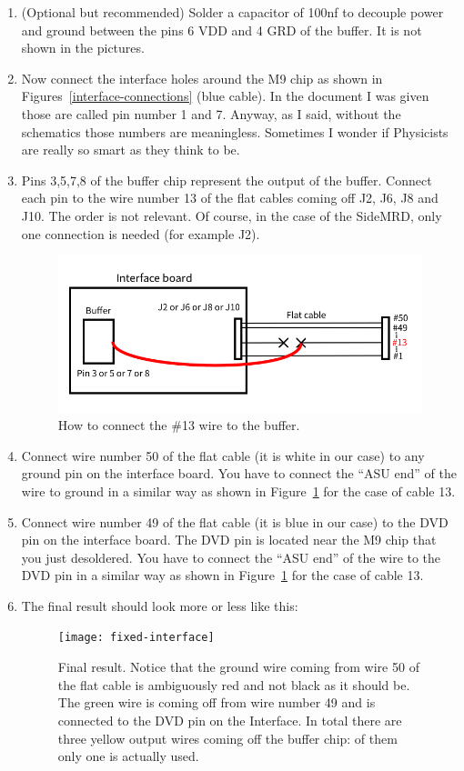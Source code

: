 \begin{enumerate}
\item (Optional but recommended) Solder a capacitor of 100nf to
  decouple power and ground between the pins 6 VDD and 4 GRD of the
  buffer. It is not shown in the pictures.
\item Now connect the interface holes around the M9 chip as shown in
  Figures~\ref{interface-connections} (blue cable). In the document I
  was given those are called pin number 1 and 7. Anyway, as I said,
  without the schematics those numbers are meaningless. Sometimes I
  wonder if Physicists are really so smart as they think to be.
\item Pins 3,5,7,8 of the buffer chip represent the output of the
  buffer. Connect each pin to the wire number 13 of the flat cables
  coming off J2, J6, J8 and J10. The order is not relevant. Of course,
  in the case of the SideMRD, only one connection is needed (for
  example J2).
  \begin{figure}[ht]
    \centering
    \includegraphics[width=0.6\linewidth]{connection_flat_cable}
    \caption{How to connect the \#13 wire to the buffer.}%
    \label{connection_flat_cable}
  \end{figure}
\item Connect wire number 50 of the flat cable (it is white in our
  case) to any ground pin on the interface board. You have to connect
  the ``ASU end'' of the wire to ground in a similar way as shown in
  Figure~\ref{connection_flat_cable} for the case of cable 13.
\item Connect wire number 49 of the flat cable (it is blue in our
  case) to the DVD pin on the interface board. The DVD pin is located
  near the M9 chip that you just desoldered. You have to connect the
  ``ASU end'' of the wire to the DVD pin in a similar way as shown in
  Figure~\ref{connection_flat_cable} for the case of cable 13.
\item The final result should look more or less like this:
  \begin{figure}[ht]
    \centering \texttt{[image: fixed-interface]}
    \caption{Final result. Notice that the ground wire coming from
      wire 50 of the flat cable is ambiguously red and not black as it
      should be. The green wire is coming off from wire number 49 and
      is connected to the DVD pin on the Interface. In total there are
      three yellow output wires coming off the buffer chip: of them
      only one is actually used.}\label{fixed-interface}
  \end{figure}
\end{enumerate}

